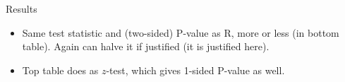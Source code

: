 \documentclass[unknownkeysallowed]{beamer}\usepackage[]{graphicx}\usepackage[]{color}
\begin{document}
\begin{frame}[fragile]{Results}

          \begin{itemize}
          \item Same test statistic and (two-sided) P-value as R, more
            or less (in bottom table). Again can halve it if justified
            (it is justified here).
          \item Top table does as $z$-test, which gives 1-sided
            P-value as well.
          \end{itemize}


\end{frame}


%
%  
%  
\end{document}
